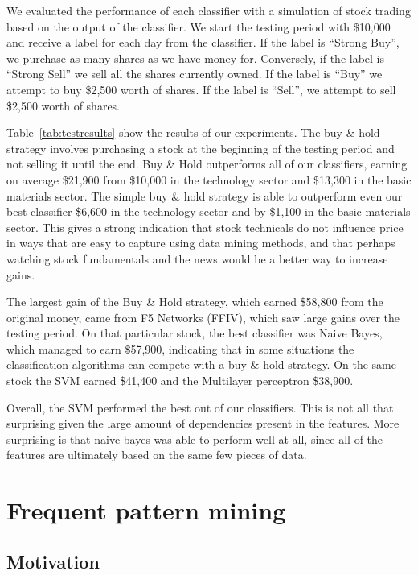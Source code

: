\documentclass[10pt]{article}
\begin{document}
We evaluated the performance of each classifier with a simulation of stock
trading based on the output of the classifier. We start the testing period with
\$10,000 and receive a label for each day from the classifier. If the label is ``Strong Buy'',
we purchase as many shares as we have money for. Conversely, if the label is
``Strong Sell'' we sell all the shares currently owned. If the label is ``Buy''
we attempt to buy \$2,500 worth of shares. If the label is ``Sell'', we attempt
to sell \$2,500 worth of shares.

Table~\ref{tab:testresults} show the results of our experiments. The buy \&
hold strategy involves purchasing a stock at the beginning of the testing
period and not selling it until the end. Buy \& Hold outperforms all of our
classifiers, earning on average \$21,900 from \$10,000 in the technology sector
and \$13,300 in the basic materials sector. The simple buy \& hold strategy is
able to outperform even our best classifier \$6,600 in the technology sector
and by \$1,100 in the basic materials sector. This gives a strong indication
that stock technicals do not influence price in ways that are easy to capture
using data mining methods, and that perhaps watching stock fundamentals
and the news would be a better way to increase gains. 

The largest gain of the Buy \& Hold strategy, which earned \$58,800 from the
original money, came from F5 Networks (FFIV), which saw large gains over the
testing period. On that particular stock, the best classifier was Naive Bayes,
which managed to earn \$57,900, indicating that in some situations the
classification algorithms can compete with a buy \& hold strategy. On the same
stock the SVM earned \$41,400 and the Multilayer perceptron \$38,900.

Overall, the SVM performed the best out of our classifiers. This is not all
that surprising given the large amount of dependencies present in the features.
More surprising is that naive bayes was able to perform well at all, since all
of the features are ultimately based on the same few pieces of data.

\section{Frequent pattern mining}
\label{sec:freqpattern}
\subsection{Motivation} 
\end{document}
